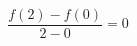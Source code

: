\documentclass[preview]{standalone}
\begin{document}
\begin{align*}
\dfrac{f(2) - f(0)}{2 - 0} = 0
\end{align*}
\end{document}
